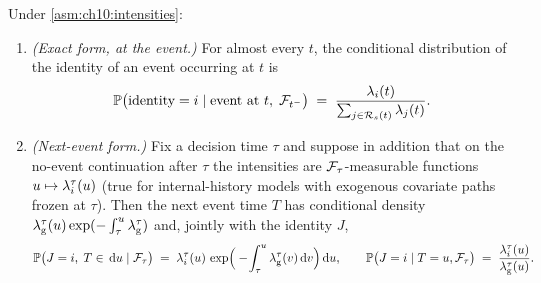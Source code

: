 \begin{proposition}\label{prop:ch10:competing}
Under \cref{asm:ch10:intensities}:
\begin{enumerate}[label=(\roman*)]
\item \emph{(Exact form, at the event.)} For almost every $t$, the
conditional distribution of the identity of an event occurring at $t$ is
\begin{equation}\label{eq:ch10:competing}
\mathbb{P}\big(\text{identity} = i \mid \text{event at } t,\; \mathcal{F}_{t^-}\big)
 \;=\;
 \frac{\lambda_i(t)}{\sum_{j \in \mathcal{R}_s(t)} \lambda_j(t)} .
\end{equation}
\item \emph{(Next-event form.)} Fix a decision time $\tau$ and suppose in
addition that on the no-event continuation after $\tau$ the intensities
are $\mathcal{F}_\tau$-measurable functions $u \mapsto \lambda_i^{\tau}(u)$ (true for
internal-history models with exogenous covariate paths frozen at $\tau$).
Then the next event time $T$ has conditional density
$\lambda^{\tau}_{\mathrm g}(u)\exp(-\int_\tau^u \lambda^{\tau}_{\mathrm g})$
and, jointly with the identity $J$,
\begin{equation}\label{eq:ch10:nextevent}
\mathbb{P}\big(J = i,\; T \in \,\mathrm{d} u \mid \mathcal{F}_\tau\big)
 \;=\;
 \lambda_i^{\tau}(u)\,
 \exp\!\Big(-\!\int_\tau^{u} \lambda^{\tau}_{\mathrm g}(v)\,\mathrm{d} v\Big) \,\mathrm{d} u,
\qquad
\mathbb{P}\big(J = i \mid T = u, \mathcal{F}_\tau\big)
 \;=\;
 \frac{\lambda_i^{\tau}(u)}{\lambda^{\tau}_{\mathrm g}(u)} .
\end{equation}
\end{enumerate}
\end{proposition}

